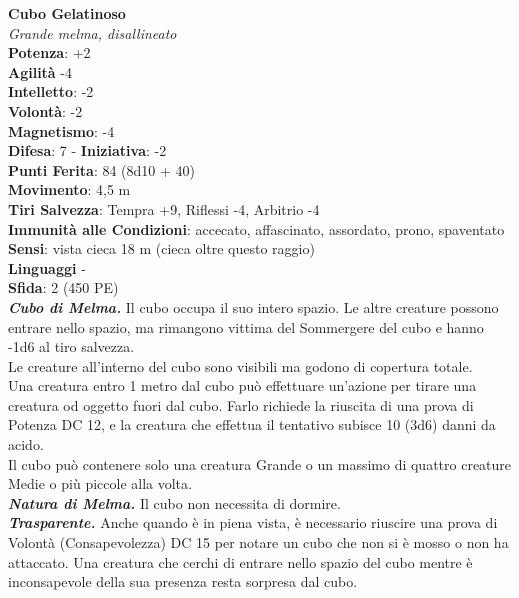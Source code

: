 \begin{multicols}{2}
\medskip\textbf{Cubo Gelatinoso}\\
\emph{Grande melma, disallineato}\\
\textbf{Potenza}: +2\\
\textbf{Agilità} -4\\
\textbf{Intelletto}: -2\\
\textbf{Volontà}: -2\\
\textbf{Magnetismo}: -4\\
\textbf{Difesa}: 7 - \textbf{Iniziativa}: -2\\
\textbf{Punti Ferita}: 84 (8d10 + 40)\\
\textbf{Movimento}: 4,5 m\\
\textbf{Tiri Salvezza}: Tempra +9, Riflessi -4, Arbitrio -4\\
\textbf{Immunità alle Condizioni}: accecato, affascinato, assordato, prono, spaventato\\
\textbf{Sensi}: vista cieca 18 m (cieca oltre questo raggio)\\
\textbf{Linguaggi} -\\
\textbf{Sfida}: 2 (450 PE)\smallskip\\
\emph{\textbf{Cubo di Melma.}} Il cubo occupa il suo intero spazio. Le altre creature possono entrare nello spazio, ma rimangono vittima del Sommergere del cubo e hanno -1d6 al tiro salvezza.\\

Le creature all'interno del cubo sono visibili ma godono di copertura totale.\\

Una creatura entro 1 metro dal cubo può effettuare un'azione per tirare una creatura od oggetto fuori dal cubo. Farlo richiede la riuscita di una prova di Potenza DC 12, e la creatura che effettua il tentativo subisce 10 (3d6) danni da acido.\\

Il cubo può contenere solo una creatura Grande o un massimo di quattro creature Medie o più piccole alla volta.\\

\emph{\textbf{Natura di Melma.}} Il cubo non necessita di dormire.\\

\emph{\textbf{Trasparente.}} Anche quando è in piena vista, è necessario riuscire una prova di Volontà (Consapevolezza) DC 15 per notare un cubo che non si è mosso o non ha attaccato. Una creatura che cerchi di entrare nello spazio del cubo mentre è inconsapevole della sua presenza resta sorpresa dal cubo.\\


\end{multicols}
